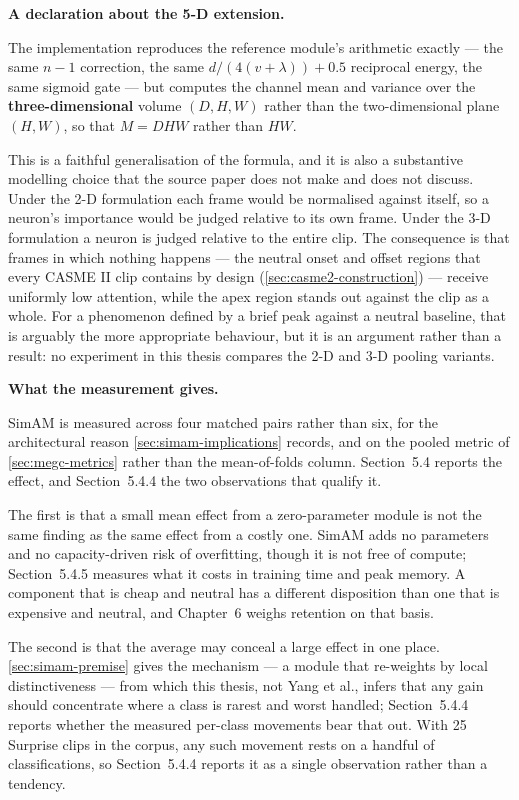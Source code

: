 \textbf{A declaration about the 5-D extension.}

The implementation reproduces the reference module's arithmetic exactly --- the same $n-1$ correction, the same $d / (4(v + \lambda)) + 0.5$ reciprocal energy, the same sigmoid gate --- but computes the channel mean and variance over the \textbf{three-dimensional} volume $(D, H, W)$ rather than the two-dimensional plane $(H, W)$, so that $M = DHW$ rather than $HW$.

This is a faithful generalisation of the formula, and it is also a substantive modelling choice that the source paper does not make and does not discuss. Under the 2-D formulation each frame would be normalised against itself, so a neuron's importance would be judged relative to its own frame. Under the 3-D formulation a neuron is judged relative to the entire clip. The consequence is that frames in which nothing happens --- the neutral onset and offset regions that every CASME II clip contains by design (\autoref{sec:casme2-construction}) --- receive uniformly low attention, while the apex region stands out against the clip as a whole. For a phenomenon defined by a brief peak against a neutral baseline, that is arguably the more appropriate behaviour, but it is an argument rather than a result: no experiment in this thesis compares the 2-D and 3-D pooling variants.

\textbf{What the measurement gives.}

SimAM is measured across four matched pairs rather than six, for the architectural reason \autoref{sec:simam-implications} records, and on the pooled metric of \autoref{sec:megc-metrics} rather than the mean-of-folds column. Section~5.4 reports the effect, and Section~5.4.4 the two observations that qualify it.

The first is that a small mean effect from a zero-parameter module is not the same finding as the same effect from a costly one. SimAM adds no parameters and no capacity-driven risk of overfitting, though it is not free of compute; Section~5.4.5 measures what it costs in training time and peak memory. A component that is cheap and neutral has a different disposition than one that is expensive and neutral, and Chapter~6 weighs retention on that basis.

The second is that the average may conceal a large effect in one place. \autoref{sec:simam-premise} gives the mechanism --- a module that re-weights by local distinctiveness --- from which this thesis, not Yang et al., infers that any gain should concentrate where a class is rarest and worst handled; Section~5.4.4 reports whether the measured per-class movements bear that out. With 25 Surprise clips in the corpus, any such movement rests on a handful of classifications, so Section~5.4.4 reports it as a single observation rather than a tendency.

